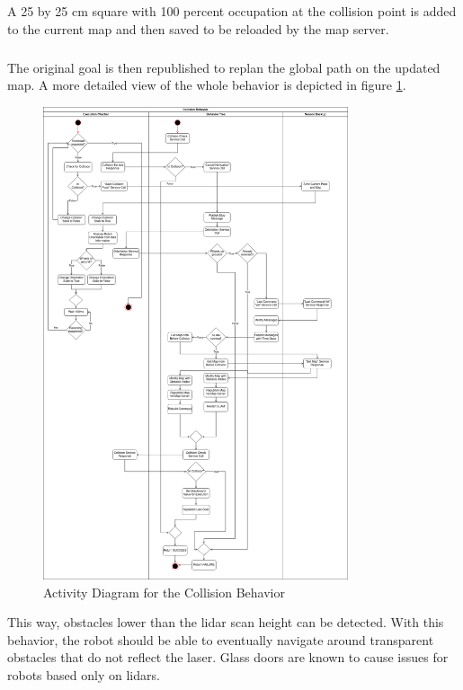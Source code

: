 A 25 by 25 cm square with 100 percent occupation at the collision point is added to the current map and then saved to be reloaded by the map server. 

\subparagraph*{}
The original goal is then republished to replan the global path on the updated map. A more detailed view of the whole behavior is depicted in figure \ref{fig:activity_diagram_collision}.

\begin{figure}[h!]
	\includegraphics[width=0.8\textwidth]{images/activity_diagram_collision.png}
	\caption{Activity Diagram for the Collision Behavior}
	\label{fig:activity_diagram_collision}
\end{figure}

This way, obstacles lower than the lidar scan height can be detected. With this behavior, the robot should be able to eventually navigate around transparent obstacles that do not reflect the laser. Glass doors are known to cause issues for robots based only on lidars. 

